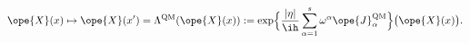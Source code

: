 \begin{equation}	\label{4.6}
\ope{X}(x)\mapsto\ope{X}(x')
= \Lambda^{\mathrm{QM}} (\ope{X}(x))
:=
\exp\Bigl\{
\frac{|\eta|}{\ih} \sum_{\alpha=1}^{s} \omega^\alpha
						\ope{J}_\alpha^{\mathrm{QM}}
\Bigr\}
\bigl(\ope{X}(x)\bigr) .
	\end{equation}

